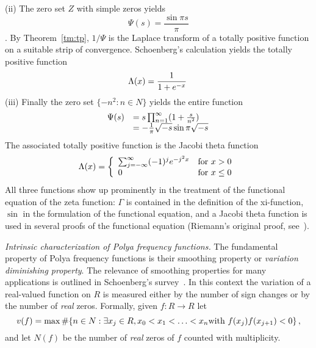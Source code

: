 \documentclass{article}
\newcommand{\tmem}[1]{{\em #1\/}}
\providecommand{\*}{{\opl}}
\newcommand{\field}[1]{#1}
\newcommand{\bR}{\field{R}}
\newcommand{\bN}{\field{N}}
\newcommand{\bZ}{\field{Z}}
\newcommand{\<}{}
\newcommand{\>}{}
\newcommand{\tp}{totally positive}
\newcommand{\pff}{Polya frequency function}
\begin{document}
(ii) The zero set $\bZ$ with simple zeros yields
\begin{equation}
  \Psi (s) = \frac{\sin \pi s}{\pi}
\end{equation}
. By Theorem~\ref{tm:tp}, $1 / \Psi$ is the Laplace transform of a {\tp}
function on a suitable strip of convergence. Schoenberg's calculation yields
the {\tp} function
\begin{equation}
  \Lambda (x) = \frac{1}{1 + e^{- x}} \hspace{0.17em}
\end{equation}
(iii) Finally the zero set $\{- n^2 : n \in \bN \}$ yields the entire function
\begin{equation}
  \begin{array}{ll}
    \Psi (s) & = s \prod_{n = 1}^{\infty} (1 + \frac{s}{n^2})\\
    & = - \frac{1}{\pi}  \sqrt{- s} \sin \pi \sqrt{- s} \hspace{0.17em}
  \end{array}
\end{equation}
The associated {\tp} function is the Jacobi theta function
\begin{equation}
  \Lambda (x) = \left\{\begin{array}{ll}
    \sum_{j = - \infty}^{\infty} (- 1)^j e^{- j^2 x} & \text{for } x > 0\\
    0 & \text{for } x \leq 0 \hspace{0.17em}
  \end{array}\right.
\end{equation}
All three functions show up prominently in the treatment of the functional
equation of the zeta function: $\Gamma$ is contained in the definition of the
xi-function, $\sin$ in the formulation of the functional equation, and a
Jacobi theta function is used in several proofs of the functional equation
(Riemann's original proof, see~{\cite{Tit86}}).

{\tmem{Intrinsic characterization of {\pff}s.}} The fundamental property of
{\pff}s is their smoothing property or {\tmem{variation diminishing
property}}. The relevance of smoothing properties for many applications is
outlined in Schoenberg's survey~{\cite{Sch53}}. In this context the variation
of a real-valued function on $\bR$ is measured either by the number of sign
changes or by the number of {\tmem{real}} zeros. Formally, given $f : \bR \to
\bR$ let
\begin{equation}
  \label{eq:v1} v (f) = \max \# \{n \in \bN : \exists x_j \in \bR, x_0 < x_1 <
  \ldots < x_n  \text{with } f (x_j) f (x_{j + 1}) < 0\} \hspace{0.17em},
\end{equation}
and let $N (f)$ be the number of {\tmem{real}} zeros of $f$ counted with
multiplicity.
\end{document}
